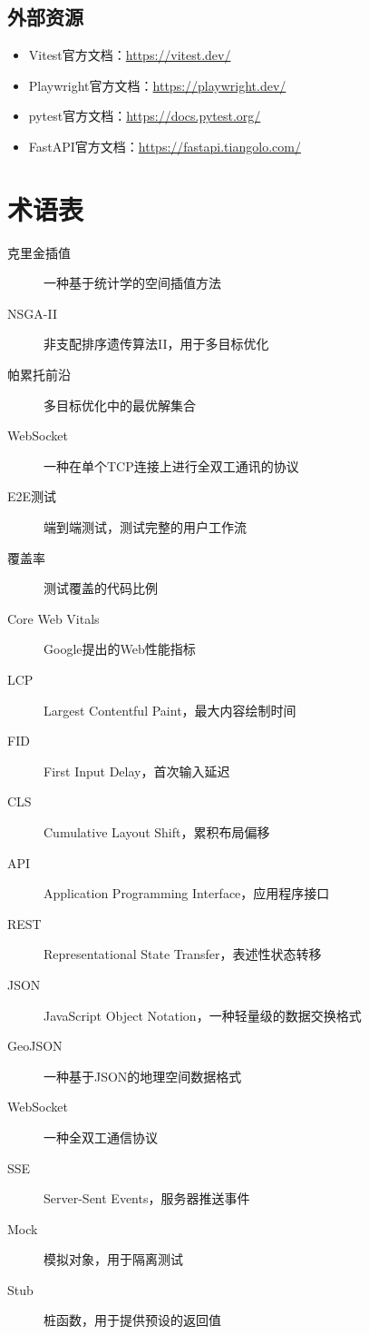\documentclass[12pt,a4paper,openany]{report}
\begin{document}
\section{外部资源}

\begin{itemize}
    \item Vitest官方文档：\url{https://vitest.dev/}
    \item Playwright官方文档：\url{https://playwright.dev/}
    \item pytest官方文档：\url{https://docs.pytest.org/}
    \item FastAPI官方文档：\url{https://fastapi.tiangolo.com/}
\end{itemize}

\chapter{术语表}

\begin{description}
    \item[克里金插值] 一种基于统计学的空间插值方法
    \item[NSGA-II] 非支配排序遗传算法II，用于多目标优化
    \item[帕累托前沿] 多目标优化中的最优解集合
    \item[WebSocket] 一种在单个TCP连接上进行全双工通讯的协议
    \item[E2E测试] 端到端测试，测试完整的用户工作流
    \item[覆盖率] 测试覆盖的代码比例
    \item[Core Web Vitals] Google提出的Web性能指标
    \item[LCP] Largest Contentful Paint，最大内容绘制时间
    \item[FID] First Input Delay，首次输入延迟
    \item[CLS] Cumulative Layout Shift，累积布局偏移
    \item[API] Application Programming Interface，应用程序接口
    \item[REST] Representational State Transfer，表述性状态转移
    \item[JSON] JavaScript Object Notation，一种轻量级的数据交换格式
    \item[GeoJSON] 一种基于JSON的地理空间数据格式
    \item[WebSocket] 一种全双工通信协议
    \item[SSE] Server-Sent Events，服务器推送事件
    \item[Mock] 模拟对象，用于隔离测试
    \item[Stub] 桩函数，用于提供预设的返回值
\end{description}
\end{document}
